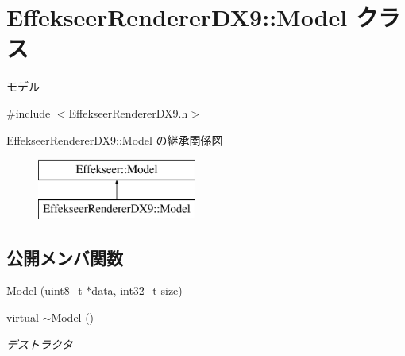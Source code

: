\hypertarget{class_effekseer_renderer_d_x9_1_1_model}{}\section{Effekseer\+Renderer\+D\+X9\+:\+:Model クラス}
\label{class_effekseer_renderer_d_x9_1_1_model}


モデル  




{\ttfamily \#include $<$Effekseer\+Renderer\+D\+X9.\+h$>$}

Effekseer\+Renderer\+D\+X9\+:\+:Model の継承関係図\begin{figure}[H]
\begin{center}
\leavevmode
\includegraphics[height=2.000000cm]{class_effekseer_renderer_d_x9_1_1_model}
\end{center}
\end{figure}
\subsection*{公開メンバ関数}
\begin{DoxyCompactItemize}
\item 
\mbox{\hyperlink{class_effekseer_renderer_d_x9_1_1_model_a2cc666c9789232bbe6bb09e5cf3fad6a}{Model}} (uint8\+\_\+t $\ast$data, int32\+\_\+t size)
\item 
virtual \mbox{\hyperlink{class_effekseer_renderer_d_x9_1_1_model_a5878dbe0a5971ffb28d6c1af347c6e87}{$\sim$\+Model}} ()
\begin{DoxyCompactList}\small\item\em デストラクタ \end{DoxyCompactList}\end{DoxyCompactItemize}
